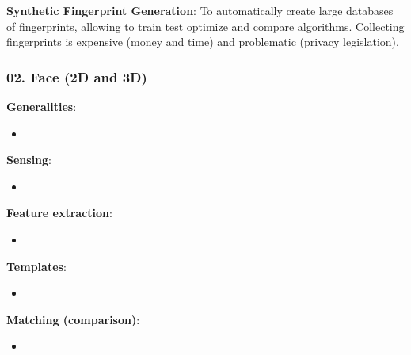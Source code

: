 \documentclass[a4paper]{article}
\begin{document}
      \textbf{Synthetic Fingerprint Generation}: To automatically create large databases of fingerprints, allowing to train test optimize and compare algorithms. Collecting fingerprints is expensive (money and time) and problematic (privacy legislation).
    \subsubsection*{02. Face (2D and 3D)}
      \textbf{Generalities}:
      \begin{itemize}
        \item 
      \end{itemize}

      \textbf{Sensing}:
      \begin{itemize}
        \item 
      \end{itemize}

      \textbf{Feature extraction}:
      \begin{itemize}
        \item 
      \end{itemize}

      \textbf{Templates}:
      \begin{itemize}
        \item 
      \end{itemize}

      \textbf{Matching (comparison)}:
      \begin{itemize}
        \item 
      \end{itemize}
\end{document}
